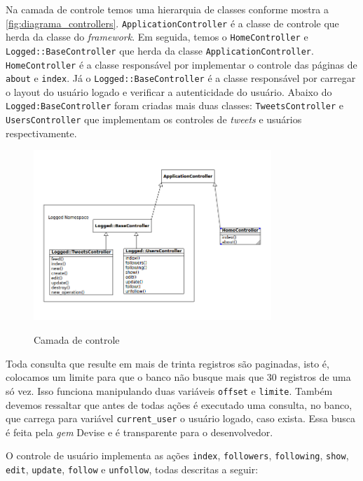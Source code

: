 Na camada de controle temos uma hierarquia de classes conforme mostra a \autoref{fig:diagrama_controllers}. \verb|ApplicationController| é a classe de controle que herda da classe do \textit{framework}. Em seguida, temos o \verb|HomeController| e \verb|Logged::BaseController| que herda  da classe \verb|ApplicationController|. \verb|HomeController| é a classe responsável por implementar o controle das páginas de \verb|about| e \verb|index|. Já o \verb|Logged::BaseController| é a classe responsável por carregar o layout do usuário logado e verificar a autenticidade do usuário.
Abaixo do \verb|Logged:BaseController| foram criadas mais duas classes: \verb|TweetsController| e \verb|UsersController| que implementam os controles de \textit{tweets} e usuários respectivamente.
\begin{figure}[H]
    \centering
    \caption{Camada de controle}
    \includegraphics[width=0.8\textwidth]{./04-figuras/controllers_complete.png}
    \label{fig:diagrama_controllers}
\end{figure}

Toda consulta que resulte em mais de trinta registros são paginadas, isto é, colocamos um limite para que o banco não busque mais que 30 registros de uma só vez. Isso funciona manipulando duas variáveis \verb|offset| e \verb|limite|. Também devemos ressaltar que
antes de todas ações é executado uma consulta, no banco, que carrega para variável \verb|current_user| o usuário logado, caso exista. Essa busca é feita pela \textit{gem} Devise e é transparente para o desenvolvedor.

O controle de usuário implementa as ações \verb|index|, \verb|followers|, \verb|following|, \verb|show|, \verb|edit|, \verb|update|, \verb|follow| e \verb|unfollow|, todas descritas a seguir:

